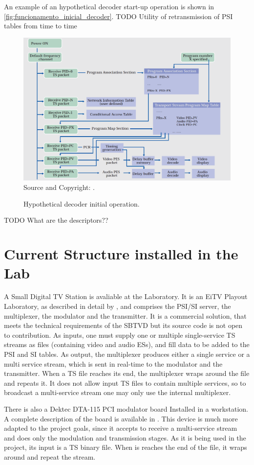 \documentclass[
	12pt,				%
	openright,			%
	twoside,			%
	a4paper,			%
	brazil,
	french,				%
	english
	]{abntex2}
\begin{document}
An example of an hypothetical decoder start-up operation is shown in \autoref{fig:funcionamento_inicial_decoder}. TODO Utility of retransmission of PSI tables from time to time 

\begin{figure}[!hb]
\centering
\caption{Hypothetical decoder initial operation.}
\includegraphics[width=0.8\linewidth]{figuras/funcionamento_inicial_decoder.png}
\\Source and Copyright: \cite{nhk}.
\label{fig:funcionamento_inicial_decoder}
\end{figure}

TODO What are the descriptors??


\chapter{Current Structure installed in the Lab}

A Small Digital TV Station is avaliable at the Laboratory. It is an EiTV Playout Laboratory, as described in detail by \cite{eitv}, and comprises the PSI/SI server, the multiplexer, the modulator and the transmitter. It is a commercial solution, that meets the technical requirements of the SBTVD but its source code is not open to contribution. As inputs, one must supply one or multiple single-service TS streams as files (containing video and audio ESs), and fill data to be added to the PSI and SI tables. As output, the multiplexer produces either a single service or a multi service stream, which is sent in real-time to the modulator and the transmitter. When a TS file reaches its end, the multiplexer wraps around the file and repeats it. It does not allow input TS files to contain multiple services, so to broadcast a multi-service stream one may only use the internal multiplexer.

There is also a Dektec DTA-115 PCI modulator board Installed in a workstation. A complete description of the board is available in \cite{dektec}. This device is much more adapted to the project goals, since it accepts to receive a multi-service stream and does only the modulation and transmission stages. As it is being used in the project, its input is a TS binary file. When is reaches the end of the file, it wraps around and repeat the stream.
\end{document}
